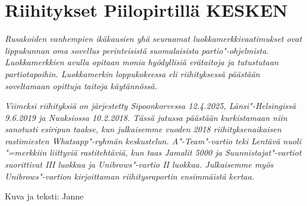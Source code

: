 \section{Riihitykset Piilopirtillä KESKEN}

\textit{Rusakoiden vanhempien ikäkausien yhä seuraamat 
luokkamerkkivaatimukset ovat lippukunnan oma sovellus perinteisistä 
suomalaisista partio"-ohjelmista. Luokkamerkkien avulla opitaan monia 
hyödyllisiä erätaitoja ja tutustutaan partiotapoihin. Luokkamerkin 
loppukokeessa eli riihityksessä päästään soveltamaan opittuja taitoja 
käytännössä.}

\textit{Viimeksi riihityksiä on järjestetty Sipoonkorvessa 12.4.2025, 
Länsi"-Helsingissä 9.6.2019 ja Nuuksiossa 10.2.2018. Tässä jutussa 
päästään kurkistamaan niin sanotusti esiripun taakse, kun julkaisemme 
vuoden 2018 riihityksenaikaisen rastimiesten Whatsapp"-ryhmän keskustelun. 
A"-Team"-vartio teki Lentävä nuoli "=merkkiin liittyviä rastitehtäviä, kun 
taas Jamalit 5000 ja Suunnistajat"-vartiot suorittivat III luokkaa ja 
Unibrows"-vartio II luokkaa. Julkaisemme myös Unibrows"-vartion kirjoittaman 
riihitysraportin ensimmäistä kertaa.}

\medskip

\noindent\null\hfill Kuva ja teksti: Janne

